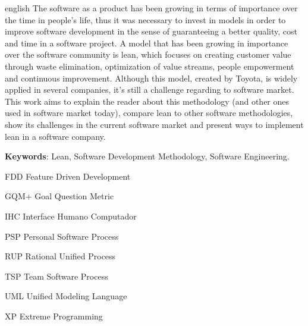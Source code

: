  
\begin{resumo}[ABSTRACT]
 \begin{otherlanguage*}{english}
 The software as a product has been growing in terms of importance over the time in people’s life, thus it was necessary to invest in models in order to improve software development in the sense of guaranteeing a better quality, cost and time in  a software project. A model that has been growing in importance over the software community is lean, which focuses on creating customer value through waste elimination, optimization of value streams, people empowerment and continuous improvement. Although this model, created by Toyota, is widely applied in several companies, it’s still a challenge regarding to software market. This work aims to explain the reader about this methodology (and other ones used in software market today), compare lean to other software methodologies, show its challenges in the current software market and present ways to implement lean in a software company.

\textbf{Keywords}: Lean, Software Development Methodology, Software Engineering.
 \end{otherlanguage*}
\end{resumo}


\listoffigures*
\cleardoublepage


\listoftables*
\cleardoublepage

\begin{siglas} %
  \item[FDD] Feature Driven Development
  \item[GQM+] Goal Question Metric
  \item[IHC] Interface Humano Computador
  \item[PSP] Personal Software Process
  \item[RUP] Rational Unified Process
  \item[TSP] Team Software Process
  \item[UML] Unified Modeling Language 
  \item[XP] Extreme Programming
\end{siglas}


 
\tableofcontents*
\cleardoublepage


